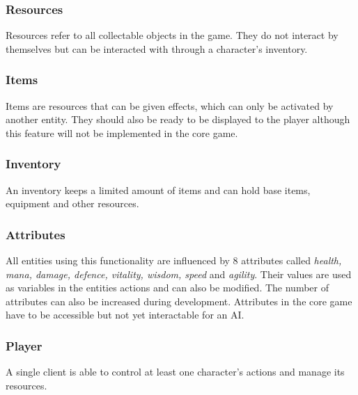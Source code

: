 \documentclass[11pt]{article}
\begin{document}
\subsubsection{Resources}
Resources refer to all collectable objects in the game. They do not interact by themselves but can be interacted with through a character's inventory.
\subsubsection{Items}
Items are resources that can be given effects, which can only be activated by another entity. 
They should also be ready to be displayed to the player although this feature will not be implemented in the core game.
\subsubsection{Inventory}
An inventory keeps a limited amount of items and can hold base items, equipment and other resources.
\subsubsection{Attributes}
All entities using this functionality are influenced by 8 attributes called \textit{health, mana, damage, defence, vitality, wisdom, speed} and \textit{agility}. 
Their values are used as variables in the entities actions and can also be modified. The number of attributes can also be increased during development.
Attributes in the core game have to be accessible but not yet interactable for an AI.
\subsubsection{Player}
A single client is able to control at least one character's actions and manage its resources.
\end{document}
